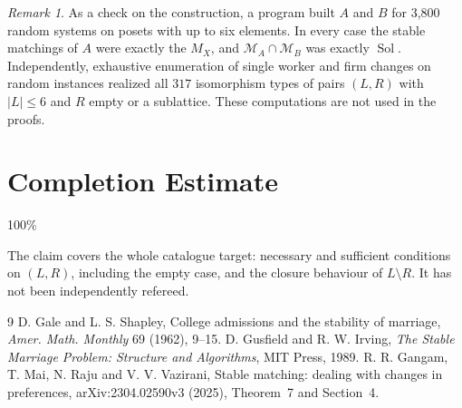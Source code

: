 \documentclass[11pt]{article}
\theoremstyle{definition}
\theoremstyle{remark}
\newtheorem{remark}[theorem]{Remark}
\newcommand{\Sol}{\operatorname{Sol}}
\begin{document}
\begin{remark}
As a check on the construction, a program built $A$ and $B$ for 3{,}800 random systems on posets with up to six elements. In every case the stable matchings of $A$ were exactly the $M_X$, and $\mathcal M_A\cap\mathcal M_B$ was exactly $\Sol$. Independently, exhaustive enumeration of single worker and firm changes on random instances realized all $317$ isomorphism types of pairs $(L,R)$ with $|L|\le6$ and $R$ empty or a sublattice. These computations are not used in the proofs.
\end{remark}

\section*{Completion Estimate}
100\%

The claim covers the whole catalogue target: necessary and sufficient conditions on $(L,R)$, including the empty case, and the closure behaviour of $L\setminus R$. It has not been independently refereed.

\begin{thebibliography}{9}
 D. Gale and L. S. Shapley, College admissions and the stability of marriage, \emph{Amer. Math. Monthly} 69 (1962), 9--15.
 D. Gusfield and R. W. Irving, \emph{The Stable Marriage Problem: Structure and Algorithms}, MIT Press, 1989.
 R. R. Gangam, T. Mai, N. Raju and V. V. Vazirani, Stable matching: dealing with changes in preferences, arXiv:2304.02590v3 (2025), Theorem~7 and Section~4.
\end{thebibliography}
\end{document}
